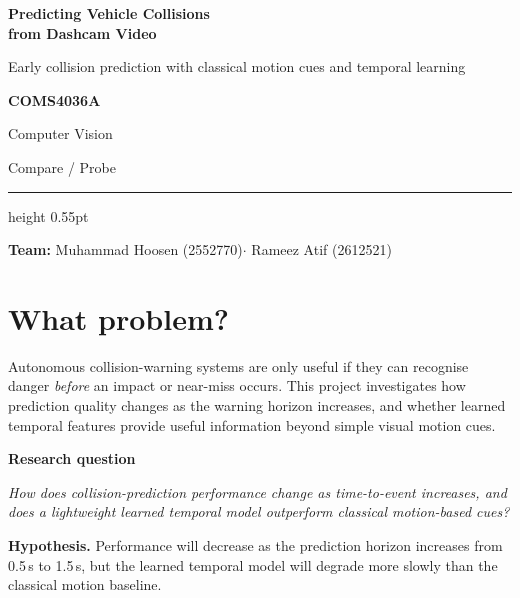 \documentclass[10pt,a4paper]{article}
\newcommand{\rqtag}{%
  \colorbox{paleblue}{\strut\textbf{\color{navy}Research question}}%
}
\begin{document}
\small

\begin{minipage}[t]{0.72\textwidth}
  {\color{navy}\bfseries\fontsize{17.5}{17}\selectfont
  Predicting Vehicle Collisions\\[-0.05em]
  from Dashcam Video}\par
  \vspace{0.30em}
  {\color{black!62}\fontsize{9.2}{11}\selectfont
  Early collision prediction with classical motion cues and temporal learning}
\end{minipage}%
\hfill
\begin{minipage}[t]{0.24\textwidth}
  \raggedleft
  {\bfseries COMS4036A}\par
  Computer Vision\par
  Compare / Probe
\end{minipage}

\vspace{0.48em}
{\color{ruleblue}\hrule height 0.55pt}
\vspace{0.78em}

\textbf{\color{navy}Team:}\quad
Muhammad Hoosen (2552770)\quad $\cdot$ \quad Rameez Atif (2612521)

\section{What problem?}

Autonomous collision-warning systems are only useful if they can recognise danger \emph{before} an impact or near-miss occurs. This project investigates how prediction quality changes as the warning horizon increases, and whether learned temporal features provide useful information beyond simple visual motion cues.

\rqtag\hspace{0.75em}\emph{How does collision-prediction performance change as time-to-event increases, and does a lightweight learned temporal model outperform classical motion-based cues?}

\textbf{Hypothesis.} Performance will decrease as the prediction horizon increases from 0.5\,s to 1.5\,s, but the learned temporal model will degrade more slowly than the classical motion baseline.

\end{document}
